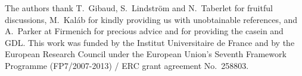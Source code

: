 \documentclass[twocolumn,superscriptaddress,showpacs,preprintnumbers,amsmath,amssymb,prl]{revtex4}
\begin{document}




\begin{acknowledgments}
The authors thank T.~Gibaud, S.~Lindstr\"om and N.~Taberlet for fruitful discussions, M.~Kal\'ab for kindly providing us with unobtainable references, and A.~Parker at Firmenich for precious advice and for providing the casein and GDL. This work was funded by the Institut Universitaire de France and by the European Research Council under the European Union's Seventh Framework Programme (FP7/2007-2013) / ERC grant agreement No.~258803. 
\end{acknowledgments}
\end{document}
